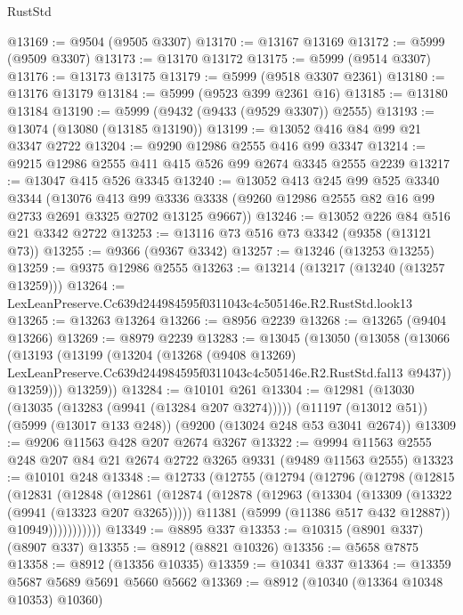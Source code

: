 \begin{lexlean}{RustStd}
\begin{coremodule}
@13169 := @9504 (@9505 @3307)
@13170 := @13167 @13169
@13172 := @5999 (@9509 @3307)
@13173 := @13170 @13172
@13175 := @5999 (@9514 @3307)
@13176 := @13173 @13175
@13179 := @5999 (@9518 @3307 @2361)
@13180 := @13176 @13179
@13184 := @5999 (@9523 @399 @2361 @16)
@13185 := @13180 @13184
@13190 := @5999 (@9432 (@9433 (@9529 @3307)) @2555)
@13193 := @13074 (@13080 (@13185 @13190))
@13199 := @13052 @416 @84 @99 @21 @3347 @2722
@13204 := @9290 @12986 @2555 @416 @99 @3347
@13214 := @9215 @12986 @2555 @411 @415 @526 @99 @2674 @3345 @2555 @2239
@13217 := @13047 @415 @526 @3345
@13240 := @13052
    @413
    @245
    @99
    @525
    @3340
    @3344
    (@13076
      @413
      @99
      @3336
      @3338
      (@9260 @12986 @2555 @82 @16 @99 @2733 @2691 @3325 @2702 @13125 @9667))
@13246 := @13052 @226 @84 @516 @21 @3342 @2722
@13253 := @13116 @73 @516 @73 @3342 (@9358 (@13121 @73))
@13255 := @9366 (@9367 @3342)
@13257 := @13246 (@13253 @13255)
@13259 := @9375 @12986 @2555
@13263 := @13214 (@13217 (@13240 (@13257 @13259)))
@13264 := LexLeanPreserve.Cc639d244984595f0311043c4c505146e.R2.RustStd.look13
@13265 := @13263 @13264
@13266 := @8956 @2239
@13268 := @13265 (@9404 @13266)
@13269 := @8979 @2239
@13283 := @13045
    (@13050
      (@13058
        (@13066
          (@13193
            (@13199
              (@13204
                (@13268
                  (@9408 @13269)
                  LexLeanPreserve.Cc639d244984595f0311043c4c505146e.R2.RustStd.fal13
                  @9437))
              @13259)))
        @13259))
@13284 := @10101 @261
@13304 := @12981
    (@13030 (@13035 (@13283 (@9941 (@13284 @207 @3274)))))
    (@11197 (@13012 @51))
    (@5999 (@13017 @133 @248))
    (@9200 (@13024 @248 @53 @3041 @2674))
@13309 := @9206 @11563 @428 @207 @2674 @3267
@13322 := @9994 @11563 @2555 @248 @207 @84 @21 @2674 @2722 @3265 @9331 (@9489 @11563 @2555)
@13323 := @10101 @248
@13348 := @12733
    (@12755
      (@12794
        (@12796
          (@12798
            (@12815
              (@12831
                (@12848
                  (@12861
                    (@12874
                      (@12878
                        (@12963
                          (@13304 (@13309 (@13322 (@9941 (@13323 @207 @3265)))))
                          @11381
                          (@5999 (@11386 @517 @432 @12887))
                          @10949)))))))))))
@13349 := @8895 @337
@13353 := @10315 (@8901 @337) (@8907 @337)
@13355 := @8912 (@8821 @10326)
@13356 := @5658 @7875
@13358 := @8912 (@13356 @10335)
@13359 := @10341 @337
@13364 := @13359 @5687 @5689 @5691 @5660 @5662
@13369 := @8912 (@10340 (@13364 @10348 @10353) @10360)

\end{coremodule}
\end{lexlean}
